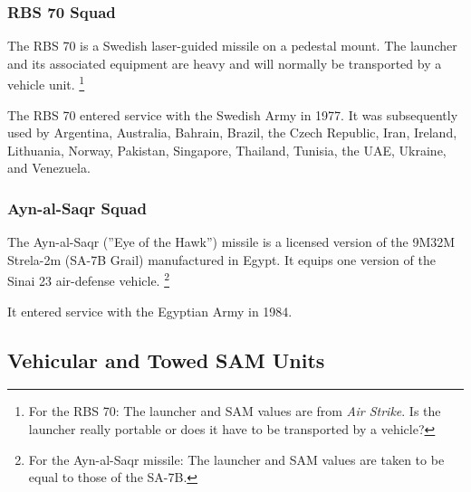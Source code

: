 \documentclass[10pt]{article}
\newcommand{\note}[1]{%
    \footnote{%
        \setlength{\parindent}{0pt}%
        \setlength{\parskip}{\smallskipamount}%
        #1
    }%
}
\begin{document}
\subsubsection{RBS 70 Squad}

The RBS 70 is a Swedish laser-guided missile on a pedestal mount. The launcher and its associated equipment are heavy and will normally be transported by a vehicle unit.%
\note{
    For the RBS 70: The launcher and SAM values are from \emph{Air Strike}. Is the launcher really portable or does it have to be transported by a vehicle?
}

The RBS 70 entered service with the Swedish Army in 1977. It was subsequently used by Argentina, Australia, Bahrain, Brazil, the Czech Republic, Iran, Ireland, Lithuania, Norway, Pakistan, Singapore, Thailand, Tunisia, the UAE, Ukraine, and Venezuela.

\subsubsection{Ayn-al-Saqr Squad}

The Ayn-al-Saqr (”Eye of the Hawk”) missile is a  licensed version of the 9M32M Strela-2m (SA-7B Grail) manufactured in Egypt. It equips one version of the Sinai 23 air-defense vehicle.%
\note{
    For the Ayn-al-Saqr missile: The launcher and SAM values are taken to be equal to those of the SA-7B.
}

It entered service with the Egyptian Army in 1984.

\subsection{Vehicular and Towed SAM Units}
\end{document}
